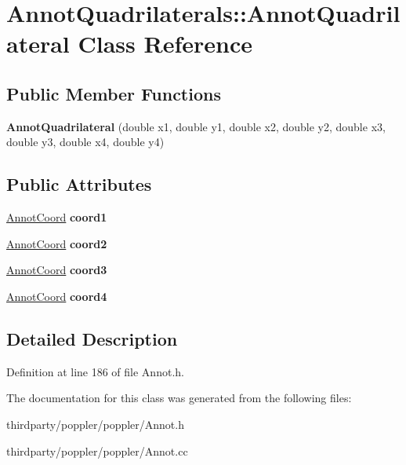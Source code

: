 \hypertarget{class_annot_quadrilaterals_1_1_annot_quadrilateral}{}\section{Annot\+Quadrilaterals\+:\+:Annot\+Quadrilateral Class Reference}
\label{class_annot_quadrilaterals_1_1_annot_quadrilateral}
\subsection*{Public Member Functions}
\begin{DoxyCompactItemize}
\item 
\mbox{\label{class_annot_quadrilaterals_1_1_annot_quadrilateral_ab93cb9d9a0fd05f06a7c675ce0fcf3db}} 
{\bfseries Annot\+Quadrilateral} (double x1, double y1, double x2, double y2, double x3, double y3, double x4, double y4)
\end{DoxyCompactItemize}
\subsection*{Public Attributes}
\begin{DoxyCompactItemize}
\item 
\mbox{\label{class_annot_quadrilaterals_1_1_annot_quadrilateral_ab8fc8d1afc6904f9c24ccf693b0d34b5}} 
\hyperlink{class_annot_coord}{Annot\+Coord} {\bfseries coord1}
\item 
\mbox{\label{class_annot_quadrilaterals_1_1_annot_quadrilateral_a26b504c20c046072507a921ea1757476}} 
\hyperlink{class_annot_coord}{Annot\+Coord} {\bfseries coord2}
\item 
\mbox{\label{class_annot_quadrilaterals_1_1_annot_quadrilateral_af29cae58c8a44df80ba7b1dc9f46c836}} 
\hyperlink{class_annot_coord}{Annot\+Coord} {\bfseries coord3}
\item 
\mbox{\label{class_annot_quadrilaterals_1_1_annot_quadrilateral_aaff90cb7c8d88a3ae2237e809638bea6}} 
\hyperlink{class_annot_coord}{Annot\+Coord} {\bfseries coord4}
\end{DoxyCompactItemize}


\subsection{Detailed Description}


Definition at line 186 of file Annot.\+h.



The documentation for this class was generated from the following files\+:\begin{DoxyCompactItemize}
\item 
thirdparty/poppler/poppler/Annot.\+h\item 
thirdparty/poppler/poppler/Annot.\+cc\end{DoxyCompactItemize}
